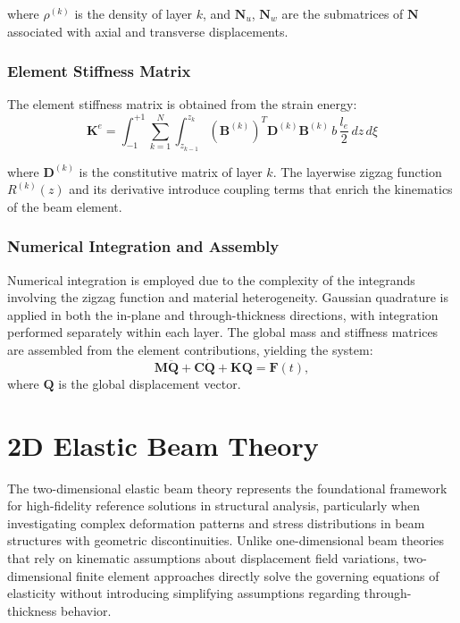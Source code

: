 \documentclass[12pt,a4paper]{report}
\begin{document}
where $\rho^{(k)}$ is the density of layer $k$, and $\mathbf{N}_u$, $\mathbf{N}_w$ are the submatrices of $\mathbf{N}$ associated with axial and transverse displacements.

\subsubsection*{Element Stiffness Matrix}

The element stiffness matrix is obtained from the strain energy:
\begin{equation}
    \mathbf{K}^e = \int_{-1}^{+1} \sum_{k=1}^{N} \int_{z_{k-1}}^{z_k} 
(\mathbf{B}^{(k)})^T \mathbf{D}^{(k)} \mathbf{B}^{(k)} \, b \, \frac{l_e}{2} \, dz \, d\xi
\end{equation}

where $\mathbf{D}^{(k)}$ is the constitutive matrix of layer $k$. The layerwise zigzag function $R^{(k)}(z)$ and its derivative introduce coupling terms that enrich the kinematics of the beam element.

\subsubsection*{Numerical Integration and Assembly}

Numerical integration is employed due to the complexity of the integrands involving the zigzag function and material heterogeneity. Gaussian quadrature is applied in both the in-plane and through-thickness directions, with integration performed separately within each layer. The global mass and stiffness matrices are assembled from the element contributions, yielding the system:
\begin{equation}
\mathbf{M} \ddot{\mathbf{Q}} + \mathbf{C} \dot{\mathbf{Q}} + \mathbf{K} \mathbf{Q} = \mathbf{F}(t),
\end{equation}
where $\mathbf{Q}$ is the global displacement vector.











\section{2D Elastic Beam Theory}
\label{sec:2d_elastic_theory}

The two-dimensional elastic beam theory represents the foundational framework for high-fidelity reference solutions in structural analysis, particularly when investigating complex deformation patterns and stress distributions in beam structures with geometric discontinuities. Unlike one-dimensional beam theories that rely on kinematic assumptions about displacement field variations, two-dimensional finite element approaches directly solve the governing equations of elasticity without introducing simplifying assumptions regarding through-thickness behavior.
\end{document}
